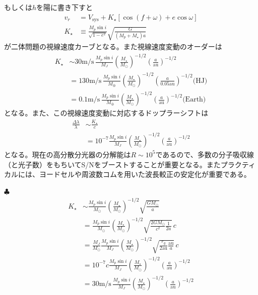 もしくは$h$を陽に書き下すと
\begin{align}
\label{eq:vrsatarefinal}
v_r &= V_\mathrm{sys} + K_\star \left[ \cos{(f+\omega)} + e \cos{\omega} \right] \\
\label{eq:vrKrv}
K_\star &\equiv \frac{M_p \sin{i}}{\sqrt{1 - e^2}} \sqrt{\frac{G}{(M_p + M_\star) a}} 
\end{align}
が二体問題の視線速度カーブとなる。また視線速度変動のオーダーは
\begin{align}
K_\star &\sim 30 \mathrm{m/s} \, \frac{M_p \sin{i}}{M_J}\left(\frac{M_\star}{M_\odot} \right)^{-1/2} \left(\frac{a}{\mathrm{au}} \right)^{-1/2} \\
&= 130 \mathrm{m/s} \, \frac{M_p \sin{i}}{M_\oplus}\left(\frac{M_\star}{M_\odot} \right)^{-1/2} \left(\frac{a}{0.05 \mathrm{au}} \right)^{-1/2} \mbox{(HJ)} \nonumber \\
&= 0.1 \mathrm{m/s} \, \frac{M_p \sin{i}}{M_\oplus}\left(\frac{M_\star}{M_\odot} \right)^{-1/2} \left(\frac{a}{\mathrm{au}} \right)^{-1/2}  \mbox{(Earth)} \nonumber 
\end{align}
となる。また、この視線速度変動に対応するドップラーシフトは
\begin{align}
    \frac{\Delta \lambda}{\lambda} &\sim \frac{K_\star}{c} \nonumber \\
    & = 10^{-7} \frac{M_p \sin{i}}{M_J}  \left(\frac{M_\star}{M_\odot} \right)^{-1/2} \left(\frac{a}{\mathrm{au}} \right)^{-1/2}
\end{align}
となる。現在の高分散分光器の分解能は$R \sim 10^5$であるので、多数の分子吸収線（と光子数）をもちいてS/Nをブーストすることが重要となる。またプラクティカルには、ヨードセルや周波数コムを用いた波長較正の安定化が重要である。


\begin{itembox}{$\clubsuit$}
\footnotesize
\color{gray}
\begin{align}
    K_\star &\sim \frac{M_p \sin{i}}{M_\odot}\left(\frac{M_\star}{M_\odot} \right)^{-1/2}  \sqrt{ \frac{G M_\odot}{a} } \nonumber \\
    &= \frac{M_p \sin{i}}{M_\odot}\left(\frac{M_\star}{M_\odot} \right)^{-1/2} \sqrt{ \frac{2 G M_\odot}{c^2}\frac{1}{2a} } \, c \nonumber \\
    &= \frac{M_J}{M_\odot} \frac{M_p \sin{i}}{M_J} \left(\frac{M_\star}{M_\odot} \right)^{-1/2} \sqrt{ \frac{r_g}{2  \mathrm{au}} \frac{\mathrm{au}}{a} }\, c \nonumber \\
    &= 10^{-7} c \frac{M_p \sin{i}}{M_J}  \left(\frac{M_\star}{M_\odot} \right)^{-1/2} \left(\frac{a}{\mathrm{au}} \right)^{-1/2} \nonumber \\
    &= 30 \mathrm{m/s} \, \frac{M_p \sin{i}}{M_J}\left(\frac{M_\star}{M_\odot} \right)^{-1/2} \left(\frac{a}{\mathrm{au}} \right)^{-1/2} \nonumber
\end{align}
\end{itembox}

